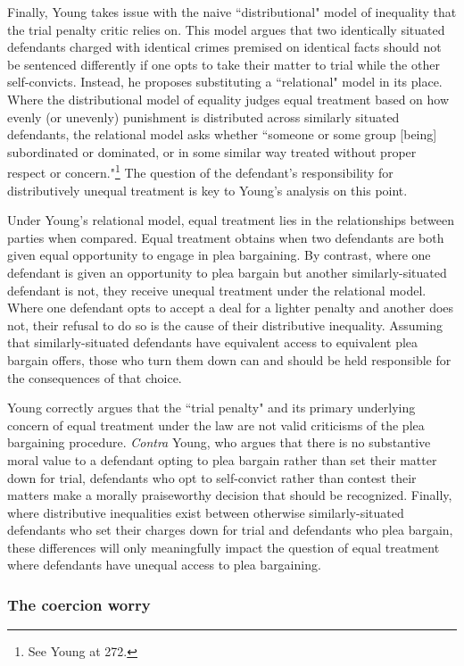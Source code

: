 Finally, Young takes issue with the naive ``distributional" model of inequality that the trial penalty critic relies on. This model argues that two identically situated defendants charged with identical crimes premised on identical facts should not be sentenced differently if one opts to take their matter to trial while the other self-convicts. Instead, he proposes substituting a ``relational" model in its place. Where the distributional model of equality judges equal treatment based on how evenly (or unevenly) punishment is distributed across similarly situated defendants, the relational model asks whether ``someone or some group [being] subordinated or dominated, or in some similar way treated without proper respect or concern."\footnote{See Young at 272.} The question of the defendant's responsibility for distributively unequal treatment is key to Young's analysis on this point.

Under Young's relational model, equal treatment lies in the relationships between parties when compared. Equal treatment obtains when two defendants are both given equal opportunity to engage in plea bargaining. By contrast, where one defendant is given an opportunity to plea bargain but another similarly-situated defendant is not, they receive unequal treatment under the relational model. Where one defendant opts to accept a deal for a lighter penalty and another does not, their refusal to do so is the cause of their distributive inequality. Assuming that similarly-situated defendants have equivalent access to equivalent plea bargain offers, those who turn them down can and should be held responsible for the consequences of that choice.

Young correctly argues that the ``trial penalty" and its primary underlying concern of equal treatment under the law are not valid criticisms of the plea bargaining procedure. \textit{Contra} Young, who argues that there is no substantive moral value to a defendant opting to plea bargain rather than set their matter down for trial, defendants who opt to self-convict rather than contest their matters make a morally praiseworthy decision that should be recognized. Finally, where distributive inequalities exist between otherwise similarly-situated defendants who set their charges down for trial and defendants who plea bargain, these differences will only meaningfully impact the question of equal treatment where defendants have unequal access to plea bargaining. 

\subsubsection{The coercion worry}

